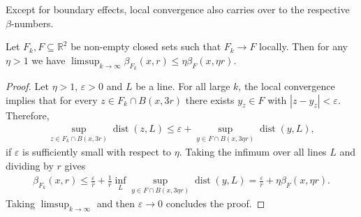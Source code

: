 \documentclass[11pt,a4paper,english,reqno]{amsart}
\numberwithin{equation}{section}
\newcommand{\RR}[0]{\mathbb{R}}
\renewcommand{\subset}{\subseteq}
\DeclareMathOperator{\dist}{dist}
\numberwithin{definition}{section}
\begin{document}
Except for boundary effects, local convergence also carries over to the respective $β$-numbers.
\begin{lemma}\label{thm:beta-local-convergence}
    Let $F_k,F\subset\RR^2$ be non-empty closed sets such that $F_k\to F$ locally.
    Then for any $η>1$ we have $\limsup_{k\to \infty} β_{F_k}(x,r) \le η β_{F}(x,ηr)$.
\end{lemma}
\begin{proof}
    Let $η>1$, $ε>0$ and $L$ be a line.
    For all large $k$, the local convergence implies that for every $z\in F_k\cap B(x,3r)$ there exists $y_z\in F$ with $|z-y_z|<ε$.
    Therefore,
    \begin{align}
        \sup_{z\in F_k\cap B(x,3r)} \dist(z,L)
        \le ε + \sup_{y\in F\cap B(x,3ηr)} \dist(y,L),
    \end{align}
    if $ε$ is sufficiently small with respect to $η$.
    Taking the infimum over all lines $L$ and dividing by $r$ gives
    \begin{align}
        β_{F_k}(x,r)
        \le \frac{ε}{r} +\frac{1}{r}\inf_L\sup_{y\in F\cap B(x,3ηr)} \dist(y,L)
        = \frac{ε}{r} + η β_F(x,ηr).
    \end{align}
    Taking $\limsup_{k\to ∞}$ and then $ε\to 0$ concludes the proof.
\end{proof}
\end{document}
